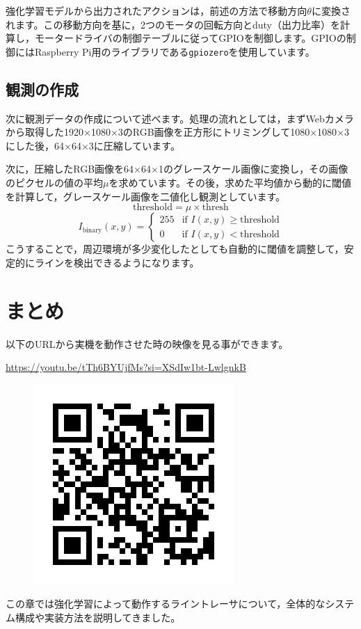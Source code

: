\documentclass{jsbook}
\numberwithin{equation}{section}
\begin{document}
強化学習モデルから出力されたアクションは，前述の方法で移動方向$\theta$に変換されます。この移動方向を基に，2つのモータの回転方向とduty（出力比率）を計算し，モータードライバの制御テーブルに従ってGPIOを制御します。GPIOの制御にはRaspberry Pi用のライブラリである\texttt{gpiozero}を使用しています。

\subsection{観測の作成}
次に観測データの作成について述べます。処理の流れとしては，まずWebカメラから取得した1920×1080×3のRGB画像を正方形にトリミングして1080×1080×3にした後，64×64×3に圧縮しています。

次に，圧縮したRGB画像を64×64×1のグレースケール画像に変換し，その画像のピクセルの値の平均$\mu$を求めています。その後，求めた平均値から動的に閾値を計算して，グレースケール画像を二値化し観測としています。
\[
\text{threshold} = \mu \times \text{thresh}
\]
\[
I_{\text{binary}}(x, y) =
\begin{cases}
255 & \text{if } I(x, y) \geq \text{threshold} \\
0 & \text{if } I(x, y) < \text{threshold}
\end{cases}
\]
こうすることで，周辺環境が多少変化したとしても自動的に閾値を調整して，安定的にラインを検出できるようになります。

\section{まとめ}
以下のURLから実機を動作させた時の映像を見る事ができます。

\url{https://youtu.be/tTh6BYUjfMs?si=XSdIw1bt-LwlgnkB}
\begin{figure}[h]
  \includegraphics[width=0.4\hsize]{fig/QR.png}
\end{figure}

この章では強化学習によって動作するライントレーサについて，全体的なシステム構成や実装方法を説明してきました。
\end{document}
